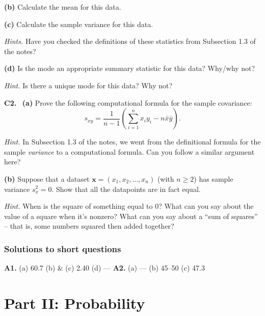 \documentclass[
  a4paper,
]{book}
\theoremstyle{definition}
\theoremstyle{definition}
\theoremstyle{definition}
\theoremstyle{definition}
\theoremstyle{remark}
\begin{document}
\textbf{(b)} Calculate the mean for this data.

\textbf{(c)} Calculate the sample variance for this data.

\begin{myanswers}
\emph{Hints.}
Have you checked the definitions of these statistics from Subsection 1.3 of the notes?

\end{myanswers}

\textbf{(d)} Is the mode an appropriate summary statistic for this data? Why/why not?

\begin{myanswers}
\emph{Hint.}
Is there a unique mode for this data? Why not?

\end{myanswers}

\textbf{C2.}
~\textbf{(a)} Prove the following computational formula for the sample covariance:
\[ s_{xy} = \frac{1}{n-1} \left( \sum_{i=1}^n x_iy_i - n\bar x \bar y \right). \]

\begin{myanswers}
\emph{Hint.}
In Subsection 1.3 of the notes, we went from the definitional formula for the sample \emph{variance} to a computational formula. Can you follow a similar argument here?

\end{myanswers}

\textbf{(b)} Suppose that a dataset \(\mathbf x = (x_1, x_2, \dots, x_n)\) (with \(n \geq 2\)) has sample variance \(s_x^2 = 0\). Show that all the datapoints are in fact equal.

\begin{myanswers}
\emph{Hint.}
When is the square of something equal to 0? What can you say about the value of a square when it's nonzero? What can you say about a ``sum of squares'' -- that is, some numbers squared then added together?

\end{myanswers}

\hypertarget{P1-short-sols}{%
\section*{Solutions to short questions}\label{P1-short-sols}}

\textbf{A1.} (a) 60.7 (b) \& (c) 2.40 (d) --- \textbf{A2.} (a) --- (b) 45--50 (c) 47.3

\hypertarget{part-part-ii-probability}{%
\part*{Part II: Probability}\label{part-part-ii-probability}}
\end{document}
